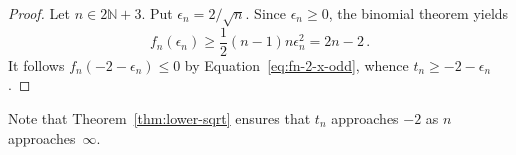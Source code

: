 \documentclass[12pt]{article}
\newcommand{\bN}{\mathbb{N}}
\begin{document}
\begin{proof}
  Let $n \in 2 \bN + 3$.
 Put $\epsilon_n = 2 / \sqrt{n}$.
  Since $\epsilon_n \ge 0$,
  the binomial theorem yields
  $$
  f_n(\epsilon_n ) \ge \frac{1}{2} (n - 1) n \epsilon_n^2 = 2 n - 2 \,.
  $$
  It follows $f_n(- 2 - \epsilon_n) \le 0$ by Equation~\eqref{eq:fn-2-x-odd}, whence $t_n \ge - 2 - \epsilon_n$.
\end{proof} 

Note that Theorem~\ref{thm:lower-sqrt} ensures that $t_n$ approaches $- 2$ as $n$ approaches~$\infty$.


 
  
\end{document}
